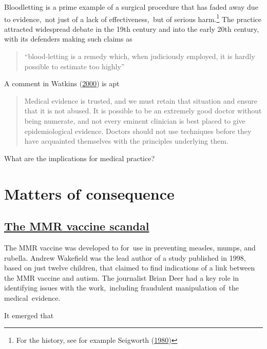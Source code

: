 \documentclass[
  10pt,
  b5paper]{book}
\begin{document}
Bloodletting is a prime example of a surgical procedure that has faded
away due to evidence,~not just of a lack of effectiveness,~but of
serious harm.\footnote{For the history, see for example
  Seigworth (\protect\hyperlink{ref-seigworth1980bloodletting}{1980})} The practice attracted widespread debate
in the 19th century and into the early 20th century, with its defenders
making such claims as

\begin{quote}
``blood-letting is a remedy which, when judiciously employed, it is
hardly possible to estimate too highly''
\end{quote}

A comment in Watkins (\protect\hyperlink{ref-watkins2000conviction}{2000}) is apt

\begin{quote}
Medical evidence is trusted, and we must retain that situation and
ensure that it is not abused. It is possible to be an extremely good
doctor without being numerate, and not every eminent clinician is best
placed to give epidemiological evidence. Doctors should not use
techniques before they have acquainted themselves with the principles
underlying them.
\end{quote}

What are the implications for medical practice?

\hypertarget{matters-of-consequence}{%
\chapter{Matters of consequence}\label{matters-of-consequence}}

\hypertarget{the-mmr-vaccine-scandal}{%
\section{\texorpdfstring{\href{https://en.wikipedia.org/wiki/MMR_vaccine_controversy}{The MMR vaccine scandal}}{The MMR vaccine scandal}}\label{the-mmr-vaccine-scandal}}

The MMR vaccine was developed to for~use in preventing measles,
mumps, and rubella. Andrew Wakefield was the lead author of a
study published in 1998, based on just twelve children, that
claimed to find indications of a link between the MMR vaccine
and autism. The journalist Brian Deer had a key role in
identifying issues with the work,~including fraudulent
manipulation of~the medical~evidence.

It emerged that
\end{document}
